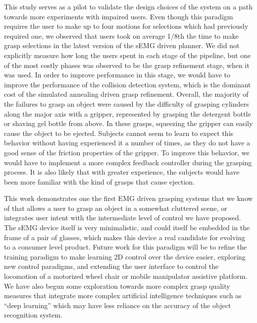 This study serves as a pilot to validate the design choices of the system on a path towards more experiments with impaired users. Even though this paradigm requires the user to make up to four motions for selections which had previously required one, we observed that users took on average 1/8th the time to make grasp selections in the latest version of the sEMG driven planner. We did not explicitly measure how long the users spent in each stage of the pipeline, but one of the most costly phases was observed to be the grasp refinement stage, when it was used. In order to improve performance in this stage, we would have to improve the performance of the collision detection system, which is the dominant cost of the simulated annealing driven grasp refinement. Overall, the majority of the failures to grasp an object were caused by the difficulty of grasping cylinders along the major axis with a gripper, represented by grasping the detergent bottle or shaving gel bottle from above. In these grasps, squeezing the gripper can easily cause the object to be ejected. Subjects cannot seem to learn to expect this behavior without having experienced it a number of times, as they do not have a good sense of the friction properties of the gripper. To improve this behavior, we would have to implement a more complex feedback controller during the grasping process. It is also likely that with greater experience, the subjects would have been more familiar with the kind of grasps that cause ejection. 

This work demonstrates one the first EMG driven grasping systems that we know of that allows a user to grasp an object in a somewhat cluttered scene, or integrates user intent with the intermediate level of control we have proposed. The sEMG device itself is very minimalistic, and could itself be embedded in the frame of a pair of glasses, which makes this device a real candidate for evolving to a consumer level product. Future work for this paradigm will be to refine the training paradigm to make learning 2D control over the device easier, exploring new control paradigms, and extending the user interface to control the locomotion of a motorized wheel chair or mobile manipulator assistive platform. We have also begun some exploration towards more complex grasp quality measures that integrate more complex artificial intelligence techniques such as ``deep learning'' which may have less reliance on the accuracy of the object recognition system. 
